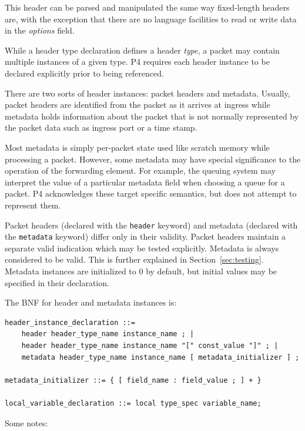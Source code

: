 \documentclass[12pt]{article}
\begin{document}
This header can be parsed and manipulated the same way fixed-length headers
are, with the exception that there are no language facilities to read or
write data in the \textit{options} field.


While a header type declaration defines a header \textit{type}, a packet may contain 
multiple instances of a given type.  P4 requires each header instance to 
be declared explicitly prior to being referenced. 

There are two sorts of header instances: packet headers and metadata. Usually, 
packet headers are identified from the packet as it arrives at ingress while 
metadata holds information about the packet that is not normally represented 
by the packet data such as ingress port or a time stamp.  

Most metadata is simply per-packet state used like scratch memory while
processing a packet. However, some metadata may have special significance to
the operation  of the forwarding element. For example, the queuing system may
interpret the value of a particular metadata field when choosing a queue for a
packet. P4 acknowledges these target specific semantics, but does not attempt
to represent them.

Packet headers (declared with the \texttt{header} keyword) and metadata (declared 
with the \texttt{metadata} keyword) differ only in their validity. Packet headers 
maintain a separate valid indication which may be tested explicitly. Metadata 
is always considered to be valid. This is further explained in 
Section~\ref{sec:testing}.  Metadata instances are 
initialized to 0 by default, but initial values may be specified in their 
declaration.

The BNF for header and metadata instances is:

\begin{lstlisting}[style=BNFstyle]
header_instance_declaration ::=
    header header_type_name instance_name ; |
    header header_type_name instance_name "[" const_value "]" ; |
    metadata header_type_name instance_name [ metadata_initializer ] ;

metadata_initializer ::= { [ field_name : field_value ; ] + }

local_variable_declaration ::= local type_spec variable_name;

\end{lstlisting}


Some notes:
\end{document}
